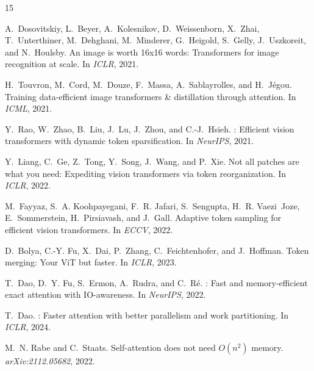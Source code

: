 \documentclass[conference]{IEEEtran}
\begin{document}
{\small

\begin{thebibliography}{15}

A.~Dosovitskiy, L.~Beyer, A.~Kolesnikov, D.~Weissenborn,
X.~Zhai, T.~Unterthiner, M.~Dehghani, M.~Minderer, G.~Heigold,
S.~Gelly, J.~Uszkoreit, and N.~Houlsby.
\newblock An image is worth 16x16 words: {T}ransformers for image
  recognition at scale.
\newblock In \emph{ICLR}, 2021.

H.~Touvron, M.~Cord, M.~Douze, F.~Massa, A.~Sablayrolles,
and H.~J\'{e}gou.
\newblock Training data-efficient image transformers \& distillation
  through attention.
\newblock In \emph{ICML}, 2021.

Y.~Rao, W.~Zhao, B.~Liu, J.~Lu, J.~Zhou, and C.-J.~Hsieh.
: Efficient vision transformers with dynamic
  token sparsification.
\newblock In \emph{NeurIPS}, 2021.

Y.~Liang, C.~Ge, Z.~Tong, Y.~Song, J.~Wang, and P.~Xie.
\newblock Not all patches are what you need: Expediting vision
  transformers via token reorganization.
\newblock In \emph{ICLR}, 2022.

M.~Fayyaz, S.~A. Koohpayegani, F.~R. Jafari,
S.~Sengupta, H.~R. Vaezi~Joze, E.~Sommerstein,
H.~Pirsiavash, and J.~Gall.
\newblock Adaptive token sampling for efficient vision transformers.
\newblock In \emph{ECCV}, 2022.

D.~Bolya, C.-Y. Fu, X.~Dai, P.~Zhang, C.~Feichtenhofer,
and J.~Hoffman.
\newblock Token merging: Your {ViT} but faster.
\newblock In \emph{ICLR}, 2023.

T.~Dao, D.~Y. Fu, S.~Ermon, A.~Rudra, and C.~R\'{e}.
: Fast and memory-efficient exact attention
  with {IO}-awareness.
\newblock In \emph{NeurIPS}, 2022.

T.~Dao.
: Faster attention with better parallelism
  and work partitioning.
\newblock In \emph{ICLR}, 2024.

M.~N. Rabe and C.~Staats.
\newblock Self-attention does not need {$O(n^2)$} memory.
\newblock \emph{arXiv:2112.05682}, 2022.


\end{thebibliography}}
\end{document}
